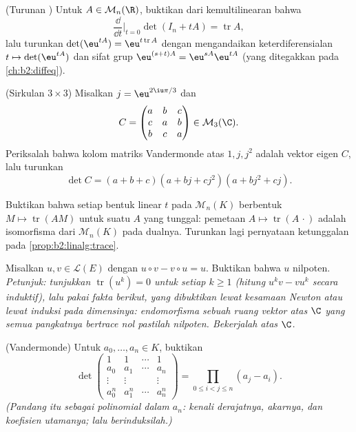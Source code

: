 \begin{exercise}[$\star\star$]\label{exo:b2:linalg:7}
(Turunan ) Untuk $A \in \mathcal{M}_n(\R)$, buktikan
dari kemultilinearan bahwa
\[
\frac{\dd}{\dd t}\Big|_{t=0} \det(I_n + tA) = \operatorname{tr} A ,
\]
lalu turunkan $\det(\eu^{tA}) = \eu^{t\operatorname{tr} A}$ dengan
mengandaikan keterdiferensialan $t \mapsto \det(\eu^{tA})$ dan sifat
grup $\eu^{(s+t)A} = \eu^{sA}\eu^{tA}$ (yang ditegakkan pada
\cref{ch:b2:diffeq}).
\end{exercise}

\begin{exercise}[$\star\star$]\label{exo:b2:linalg:8}
(Sirkulan $3 \times 3$) Misalkan $j = \eu^{2\iu\pi/3}$ dan
\[
C = \begin{pmatrix}
a & b & c\\
c & a & b\\
b & c & a
\end{pmatrix} \in \mathcal{M}_3(\C).
\]
Periksalah bahwa kolom matriks Vandermonde atas $1, j, j^2$ adalah
vektor eigen $C$, lalu turunkan
\[
\det C = (a + b + c)(a + bj + cj^2)(a + bj^2 + cj).
\]
\end{exercise}

\begin{exercise}[$\star\star\star$]\label{exo:b2:linalg:9}
Buktikan bahwa setiap bentuk linear $t$ pada $\mathcal{M}_n(K)$ berbentuk
$M \mapsto \operatorname{tr}(AM)$ untuk suatu $A$ yang tunggal: pemetaan
$A \mapsto \operatorname{tr}(A\,\cdot)$ adalah isomorfisma dari
$\mathcal{M}_n(K)$ pada dualnya. Turunkan lagi pernyataan ketunggalan
pada \cref{prop:b2:linalg:trace}.
\end{exercise}

\begin{exercise}[$\star\star\star$]\label{exo:b2:linalg:10}
Misalkan $u, v \in \mathcal{L}(E)$ dengan $u \circ v - v \circ u = u$.
Buktikan bahwa $u$ nilpoten. \emph{Petunjuk: tunjukkan
$\operatorname{tr}(u^k) = 0$ untuk setiap $k \geq 1$ (hitung $u^k v -
v u^k$ secara induktif), lalu pakai fakta berikut, yang dibuktikan lewat
kesamaan Newton atau lewat induksi pada dimensinya: endomorfisma
sebuah ruang vektor atas $\C$ yang semua pangkatnya bertrace nol
pastilah nilpoten. Bekerjalah atas $\C$.}
\end{exercise}

\begin{exercise}[$\star\star$]\label{exo:b2:linalg:11}
(Vandermonde) Untuk $a_0, \dots, a_n \in K$, buktikan
\[
\det\begin{pmatrix}
1 & 1 & \cdots & 1\\
a_0 & a_1 & \cdots & a_n\\
\vdots & \vdots & & \vdots\\
a_0^n & a_1^n & \cdots & a_n^n
\end{pmatrix}
= \prod_{0 \leq i < j \leq n} (a_j - a_i).
\]
\emph{(Pandang  itu sebagai polinomial dalam $a_n$: kenali
derajatnya, akarnya, dan koefisien utamanya; lalu berinduksilah.)}
\end{exercise}

